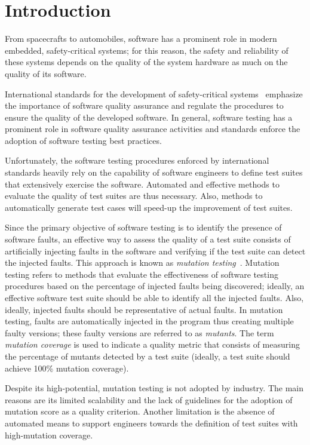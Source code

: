 
\chapter*{Introduction}
\label{sec:introduction}

From spacecrafts to automobiles, software has a prominent role in modern embedded, safety-critical systems; for this reason, the safety and reliability of these systems 
depends on the quality of the system hardware as much on the quality of its software.

International standards for the development of safety-critical systems~\cite{ecss40C,ecss80C,ISO26262} emphasize the importance of software quality assurance and regulate the procedures to ensure the quality of the developed software. In general, software testing has a prominent role in software quality assurance activities and standards enforce the adoption of software testing best practices.

Unfortunately, the software testing procedures enforced by international standards heavily rely on the capability of software engineers to define test suites that extensively exercise the software. Automated and effective methods to evaluate the quality of test suites are thus necessary. Also, methods to automatically generate test cases will speed-up the improvement of test suites. 

Since the primary objective of software testing is to identify the presence of software faults, an effective way to assess the quality of a test suite consists of artificially injecting faults in the software and verifying if the test suite can detect the injected faults. 
This approach is known as \emph{mutation testing}~\cite{DeMillo78}. Mutation testing refers to methods that evaluate the effectiveness of software testing procedures based on the percentage of injected faults being discovered; ideally, an effective software test suite should be able to identify all the injected faults. Also, ideally, injected faults should be representative of actual faults. 
In mutation testing, faults are automatically injected in the program thus creating multiple faulty versions; these faulty versions are referred to as \emph{mutants}.  The term \emph{mutation coverage} is used to indicate a quality metric that consists of measuring the percentage of mutants detected by a test suite (ideally, a test suite should achieve 100\% mutation coverage). 

Despite its high-potential, mutation testing is not adopted by industry. The main reasons are its limited scalability and the lack of guidelines for the adoption of mutation score as a quality criterion. Another limitation is the absence of automated means to support engineers towards the definition of test suites with high-mutation coverage.

